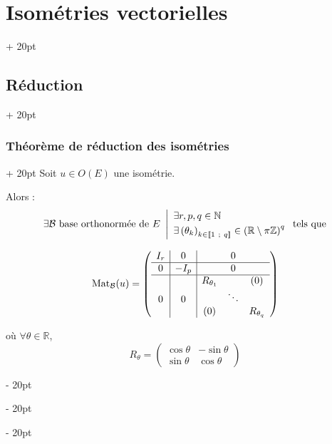 \documentclass[a4paper, 12pt, twoside]{article}
\newcommand{\N}{\mathbb{N}} %
\newcommand{\Z}{\mathbb{Z}} %
\newcommand{\R}{\mathbb{R}} %
\newcommand{\nset}[2]{\left\llbracket #1\ ;\ #2 \right\rrbracket}
\newcommand{\lr}[1]{\left( #1 \right)}
\newcommand{\ind}[1][20pt]{\advance\leftskip + #1}
\newcommand{\deind}[1][20pt]{\advance\leftskip - #1}
\newenvironment{indt}[2][20pt]{#2 \par \ind[#1]}{\par \deind} %
\begin{document}
\begin{indt}{\section{Isométries vectorielles}}
\begin{indt}{\subsection{Réduction}}
            \vspace{12pt}
            
            \begin{indt}{\subsubsection{Théorème de réduction des isométries}}
                Soit $u \in O(E)$ une isométrie.

                Alors :
                \[
                    \exists \mathcal B\ \text{base orthonormée de}\ E\
                    \left|
                    \begin{array}{l}
                        \exists r, p, q \in \N
                        \vspace{3pt}
                        \\
                        \exists \lr{\theta_k}_{k \in \nset 1 q} \in \lr{\R \setminus \pi \Z}^q
                    \end{array}
                    \right.
                    \text{tels que}
                \]

                \[
                    \mathrm{Mat}_{\mathcal B}(u) =
                    \left(
                    \begin{array}{c|c|ccc}
                        I_r & 0 && 0
                        \\
                        \hline
                        0 & -I_p && 0
                        \\
                        \hline
                        && R_{\theta_1} && (0)
                        \\
                        0 & 0 && \ddots
                        \\
                        && (0) && R_{\theta_q}
                    \end{array}
                    \right)
                \]

                où $\forall \theta \in \R$,
                \[
                    R_\theta =
                    \begin{pmatrix}
                        \cos \theta & -\sin \theta
                        \\
                        \sin \theta & \cos \theta
                    \end{pmatrix}
                \]
            \end{indt}
        \end{indt}
    \end{indt}
    
\end{document}
